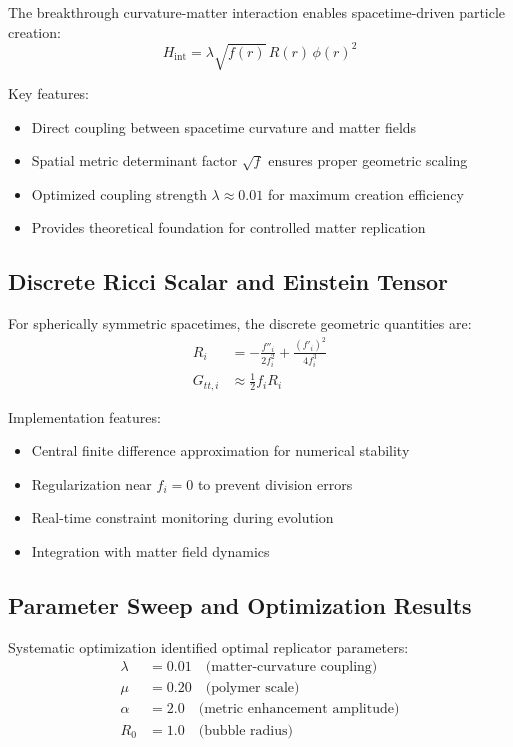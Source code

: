 \documentclass[11pt]{article}
\begin{document}
The breakthrough curvature-matter interaction enables spacetime-driven particle creation:
\begin{equation}
H_{\text{int}} = \lambda\sqrt{f(r)}\,R(r)\,\phi(r)^2
\end{equation}

Key features:
\begin{itemize}
\item Direct coupling between spacetime curvature and matter fields
\item Spatial metric determinant factor $\sqrt{f}$ ensures proper geometric scaling
\item Optimized coupling strength $\lambda \approx 0.01$ for maximum creation efficiency
\item Provides theoretical foundation for controlled matter replication
\end{itemize}

\subsection{Discrete Ricci Scalar and Einstein Tensor}

For spherically symmetric spacetimes, the discrete geometric quantities are:
\begin{align}
R_i &= -\frac{f''_i}{2f_i^2} + \frac{(f'_i)^2}{4f_i^3} \\
G_{tt,i} &\approx \frac{1}{2}f_i R_i
\end{align}

Implementation features:
\begin{itemize}
\item Central finite difference approximation for numerical stability
\item Regularization near $f_i = 0$ to prevent division errors
\item Real-time constraint monitoring during evolution
\item Integration with matter field dynamics
\end{itemize}

\subsection{Parameter Sweep and Optimization Results}

Systematic optimization identified optimal replicator parameters:
\begin{align}
\lambda &= 0.01 \quad \text{(matter-curvature coupling)} \\
\mu &= 0.20 \quad \text{(polymer scale)} \\
\alpha &= 2.0 \quad \text{(metric enhancement amplitude)} \\
R_0 &= 1.0 \quad \text{(bubble radius)}
\end{align}
\end{document}
